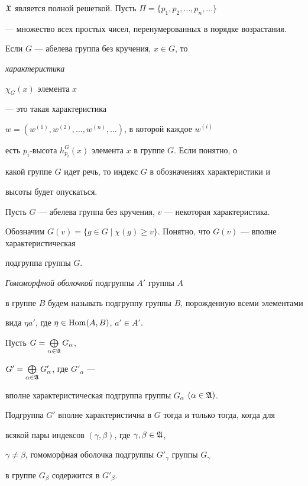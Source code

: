 $\frak X$ является полной решеткой. Пусть $\Pi=\{p_1,p_2,\dotsc,p_n,\dotsc\}$


--- множество всех простых чисел, перенумерованных в порядке возрастания.


Если $G$ --- абелева группа без кручения, $x\in G$, то {\em характеристика


$\chi_G(x)$ элемента $x$} --- это такая характеристика


$w=(w^{(1)}, w^{(2)},\dotsc,w^{(n)},\dotsc)$, в которой каждое $w^{(i)}$


есть $p_i$-высота $h_{p_i}^G(x)$ элемента $x$ в группе $G$. Если понятно, о


какой группе $G$ идет речь, то индекс $G$ в обозначениях характеристики и


высоты будет опускаться.





Пусть $G$ --- абелева группа без кручения, $v$ --- некоторая характеристика.


Обозначим $G(v)=\{g\in G\mid


\chi(g)\geqslant v\}$. Понятно, что $G(v)$ --- вполне характеристическая


подгруппа группы $G$.





\begin{defnnonum}


{\em Гомоморфной оболочкой} подгруппы $A'$ группы $A$


в группе $B$ будем называть подгруппу группы $B$, порожденную всеми элементами


вида $\eta a'$, где $\eta\in\operatorname{Hom}(A,B)$, $a'\in A'$.


\end{defnnonum}





\begin{lem}


Пусть $G=\bigoplus\limits_{\alpha\in\frak A }G_\alpha$,


$G'=\bigoplus\limits_{\alpha\in\frak A }G'_\alpha$, где $G'_\alpha$ ---


вполне характеристическая подгруппа группы $G_\alpha$ $(\alpha\in\frak A)$.


Подгруппа $G'$ вполне характеристична в $G$ тогда и только тогда, когда для


всякой пары индексов $(\gamma,\beta)$, где $\gamma,\beta\in\frak A$,


$\gamma\ne\beta$, гомоморфная оболочка подгруппы $G'_\gamma$ группы $G_\gamma$


в группе $G_\beta$ содержится в $G'_\beta$.


\end{lem}





